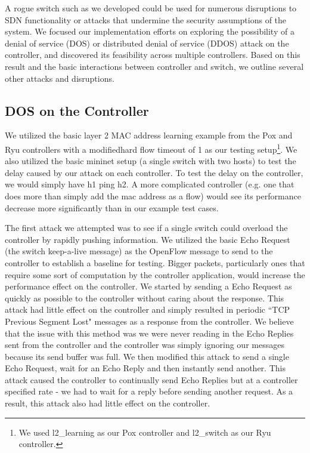 A rogue switch such as we developed could be used for numerous disruptions to SDN functionality or attacks that undermine the security assumptions of the system.  We focused our implementation efforts on exploring the possibility of a denial of service (DOS) or distributed denial of service (DDOS) attack on the controller, and discovered its feasibility across multiple controllers.  Based on this result and the basic interactions between controller and switch, we outline several other attacks and disruptions. 

\subsection{DOS on the Controller}
We utilized the basic layer 2 MAC address learning example from the Pox and Ryu controllers with a modifiedhard flow timeout of 1 as our testing setup\footnote{We used l2\_learning as our Pox controller and l2\_switch as our Ryu controller.}. We also utilized the basic mininet setup (a single switch with two hosts) to test the delay caused by our attack on each controller. To test the delay on the controller, we would simply have h1 ping h2. A more complicated controller (e.g. one that does more than simply add the mac address as a flow) would see its performance decrease more significantly than in our example test cases.

 The first attack we attempted was to see if a single switch could overload the controller by rapidly pushing information. We utilized the basic Echo Request (the switch keep-a-live message) as the OpenFlow message to send to the controller to establish a baseline for testing. Bigger packets, particularly ones that require some sort of computation by the controller application, would increase the performance effect on the controller. We started by sending a Echo Request as quickly as possible to the controller without caring about the response. This attack had little effect on the controller and simply resulted in periodic ``TCP Previous Segment Lost" messages as a response from the controller. We believe that the issue with this method was we were never reading in the Echo Replies sent from the controller and the controller was simply ignoring our messages because its send buffer was full. We then modified this attack to send a single Echo Request, wait for an Echo Reply and then instantly send another. This attack caused the controller to continually send Echo Replies but at a controller specified rate - we had to wait for a reply before sending another request. As a result, this attack also had little effect on the controller.

